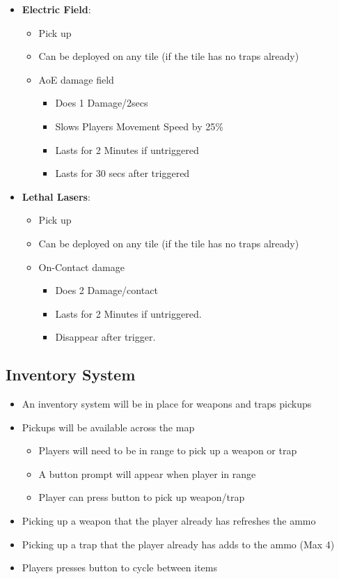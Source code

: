 \documentclass[10pt]{report}
\begin{document}
\begin{itemize}
    \item \textbf{Electric Field}:
    \begin{itemize}
        \item Pick up
        \item Can be deployed on any tile (if the tile has no traps already)
        \item AoE damage field
        \begin{itemize}
            \item Does 1 Damage/2secs
            \item Slows Players Movement Speed by 25\%
            \item Lasts for 2 Minutes if untriggered
            \item Lasts for 30 secs after triggered
        \end{itemize}
    \end{itemize}
    \item \textbf{Lethal Lasers}:
    \begin{itemize}
        \item Pick up
        \item Can be deployed on any tile (if the tile has no traps already)
        \item On-Contact damage
        \begin{itemize}
            \item Does 2 Damage/contact
            \item Lasts for 2 Minutes if untriggered.
            \item Disappear after trigger.
        \end{itemize}
    \end{itemize}
\end{itemize}

\subsection{Inventory System}

\begin{itemize}
    \item An inventory system will be in place for weapons and traps pickups
    \item Pickups will be available across the map 
    \begin{itemize}
        \item Players will need to be in range to pick up a weapon or trap
        \item A button prompt will appear when player in range
        \item Player can press button to pick up weapon/trap
    \end{itemize}
    \item Picking up a weapon that the player already has refreshes the ammo
    \item Picking up a trap that the player already has adds to the ammo (Max 4)
    \item Players presses button to cycle between items
\end{itemize}
\end{document}
